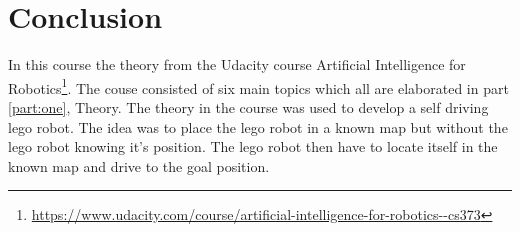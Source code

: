 \chapter{Conclusion}
\label{chp:conc}

In this course the theory from the Udacity course Artificial Intelligence for Robotics\footnote{\url{https://www.udacity.com/course/artificial-intelligence-for-robotics--cs373}}. The couse consisted of six main topics which all are elaborated in part \ref{part:one}, Theory. The theory in the course was used to develop a self driving lego robot. The idea was to place the lego robot in a known map but without the lego robot knowing it's position. The lego robot then have to locate itself in the known map and drive to the goal position.